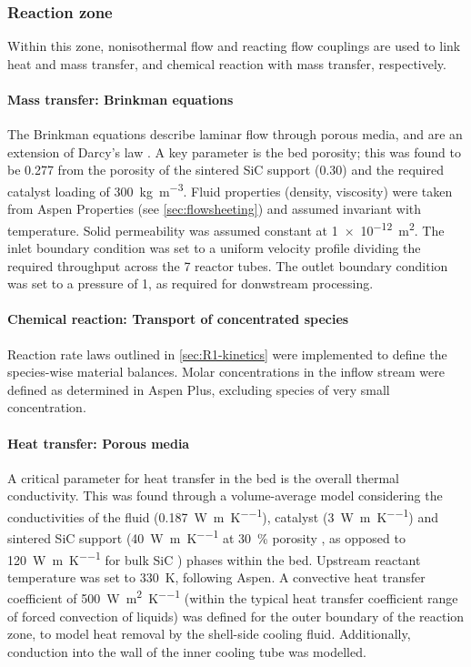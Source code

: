 \subsubsection{Reaction zone}
Within this zone, nonisothermal flow and reacting flow couplings are used to link heat and mass transfer, and chemical reaction with mass transfer, respectively.

\paragraph{Mass transfer: Brinkman equations}
The Brinkman equations describe laminar flow through porous media, and are an extension of Darcy's law \cite{comsol_cfd_2020}. A key parameter is the bed porosity; this was found to be \num{0.277} from the porosity of the sintered SiC support (0.30) and the required catalyst loading of \SI{300}{\kg\per\cubic\m}. Fluid properties (density, viscosity) were taken from Aspen Properties (see \cref{sec:flowsheeting}) and assumed invariant with temperature. Solid permeability was assumed constant at \SI{1e-12}{\square\m}. The inlet boundary condition was set to a uniform velocity profile dividing the required throughput across the 7 reactor tubes. The outlet boundary condition was set to a pressure of \SI{1}{\atm}, as required for donwstream processing.

\paragraph{Chemical reaction: Transport of concentrated species}
Reaction rate laws outlined in \cref{sec:R1-kinetics} were implemented to define the species-wise material balances. Molar concentrations in the inflow stream were defined as determined in Aspen Plus, excluding species of very small concentration.

\paragraph{Heat transfer: Porous media}
A critical parameter for heat transfer in the bed is the overall thermal conductivity. This was found through a volume-average model considering the conductivities of the fluid (\SI{0.187}{\W\per\m\per\K}), catalyst (\SI{3}{\W\per\m\per\K}) and sintered SiC support (\SI{40}{\W\per\m\per\K} at \SI{30}{\percent} porosity \cite{jang_thermophysical_2007}, as opposed to \SI{120}{\W\per\m\per\K} for bulk SiC \cite{accuratus_silicon_2013}) phases within the bed. Upstream reactant temperature was set to \SI{330}{\K}, following Aspen. A convective heat transfer coefficient of \SI{500}{\W\per\square\m\per\K} (within the typical heat transfer coefficient range of forced convection of liquids) \cite{kosky_chapter_2013} was defined for the outer boundary of the reaction zone, to model heat removal by the shell-side cooling fluid. Additionally, conduction into the wall of the inner cooling tube was modelled.

